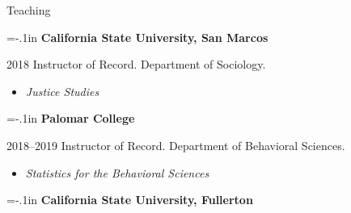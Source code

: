 
\begin{rSection}{Teaching}
\noindent \vspace*{-1.5em}



{\parindent=-.1in {\bf California State University, San Marcos}}
\vspace*{-.5em} 

\begin{hangt}{2018  \datefill}
Instructor of Record. Department of Sociology. 
\vspace*{-.5em} 
\begin{itemize}[leftmargin=.25in] \vspace*{-.25em} 
\item {\footnotesize \it Justice Studies}
\end{itemize}
\end{hangt}

{\parindent=-.1in {\bf Palomar College}}
\vspace*{-.5em} 

\begin{hangt}{2018--2019}
Instructor of Record. Department of Behavioral Sciences. 
\vspace*{-.5em} 
\begin{itemize}[leftmargin=.25in] \vspace*{-.25em} 
\item {\footnotesize \it Statistics for the Behavioral Sciences}
\end{itemize}
\end{hangt}


{\parindent=-.1in {\bf California State University, Fullerton}}
\vspace*{-.5em} 


\end{rSection}
